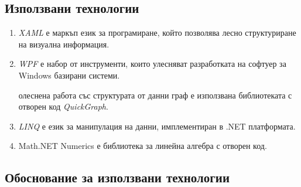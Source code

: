 \subsection{Използвани технологии}


\begin{enumerate}
  разработката на приложението е използвана интегрираната среда за разработка на софтуер \textit{Visual Studio 2017}. 
  програмен език е \textit{C Sharp}. 
  визуализацията на примитиви в 3D е използвана библиотеката с отворен код \textit{Helix Toolkit 3D}. Позволява достъп до вече настроен viewport, както и някои базови за работата с 3D обекти функции – ротация, транслация и скалиране.
 
 \item \textit{XAML} е маркъп език за програмиране, който позволява лесно структуриране на визуална информация.
 
 \item \textit{WPF} е набор от инструменти, които улесняват разработката на софтуер за Windows базирани системи.
 
  олеснена работа със структурата от данни граф е използвана библиотеката с отворен код \textit{QuickGraph}. 
 
 \item \textit{LINQ} е език за манипулация на данни, имплементиран в .NET платформата.
 
 \item Math.NET Numerics е библиотека за линейна алгебра с отворен код.
\end{enumerate}

\subsection{Обоснование за използвани технологии}

